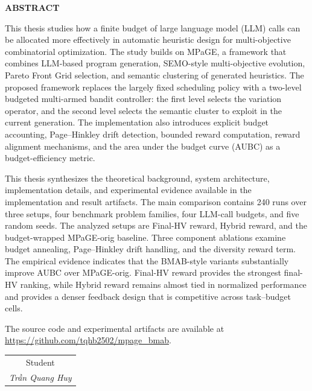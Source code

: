 \documentclass[../main.tex]{subfiles}
\begin{document}
\begin{center}
    \Large{\textbf{ABSTRACT}}\\
\end{center}
\vspace{1cm}
This thesis studies how a finite budget of large language model (LLM) calls can be allocated more effectively in automatic heuristic design for multi-objective combinatorial optimization. The study builds on MPaGE, a framework that combines LLM-based program generation, SEMO-style multi-objective evolution, Pareto Front Grid selection, and semantic clustering of generated heuristics. The proposed framework replaces the largely fixed scheduling policy with a two-level budgeted multi-armed bandit controller: the first level selects the variation operator, and the second level selects the semantic cluster to exploit in the current generation. The implementation also introduces explicit budget accounting, Page--Hinkley drift detection, bounded reward computation, reward alignment mechanisms, and the area under the budget curve (AUBC) as a budget-efficiency metric.

This thesis synthesizes the theoretical background, system architecture, implementation details, and experimental evidence available in the implementation and result artifacts. The main comparison contains 240 runs over three setups, four benchmark problem families, four LLM-call budgets, and five random seeds. The analyzed setups are Final-HV reward, Hybrid reward, and the budget-wrapped MPaGE-orig baseline. Three component ablations examine budget annealing, Page--Hinkley drift handling, and the diversity reward term. The empirical evidence indicates that the BMAB-style variants substantially improve AUBC over MPaGE-orig. Final-HV reward provides the strongest final-HV ranking, while Hybrid reward remains almost tied in normalized performance and provides a denser feedback design that is competitive across task--budget cells.

The source code and experimental artifacts are available at \url{https://github.com/tqhb2502/mpage_bmab}.

\begin{flushright}
\begin{tabular}{@{}c@{}}
Student\\
\textit{Trần Quang Huy}
\end{tabular}
\end{flushright}
\end{document}
